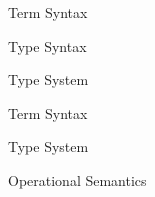 \documentclass{article}
\begin{document}
\begin{figure}[]
  \centering
  
  \caption{\EEFF Term Syntax}
\end{figure}

\begin{figure}[]
  \centering
  
  \caption{\EEFF Type Syntax}
\end{figure}

\begin{figure}[]
  \centering
  
  \caption{\EEFF Type System}
\end{figure}

\begin{figure}[]
  \centering
  
  \caption{\EEFF Term Syntax}
\end{figure}

\begin{figure}[]
  \centering
  
  \caption{\EEFF Type System}
\end{figure}


\begin{figure}[]
  \centering
  
  \caption{\EEFF Operational Semantics}
\end{figure}
\end{document}
